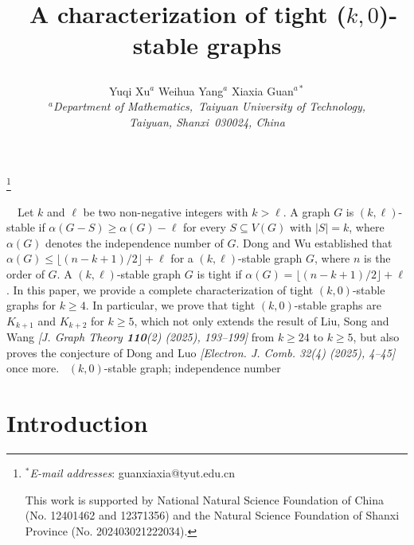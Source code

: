 \def\CTeXPreproc{Created by ctex v0.2.14, don't edit!}\def\CTeXPreproc{Created by ctex v0.2.14, don't edit!}\documentclass[11pt, twoside]{article}
\begin{document}
\setlength\abovedisplayskip{2pt}
\setlength\abovedisplayshortskip{0pt}
\setlength\belowdisplayskip{2pt}
\setlength\belowdisplayshortskip{0pt}

\title{\huge\  A characterization of tight ($ k, 0 $)-stable graphs
	\author{\small  Yuqi Xu$^{a}$ \quad Weihua Yang$^{a}$ \quad Xiaxia Guan$^{a*}$\\
		\small \textit{$^{a}$Department of Mathematics,\ Taiyuan University of Technology,}\\
		\small \textit{Taiyuan, Shanxi\ 030024, China}
	}\date{}}
\maketitle \footnote{
	\textit{$ ^* $E-mail addresses}: guanxiaxia@tyut.edu.cn
	
	This work is supported by National Natural Science Foundation of China (No. 12401462 and 12371356) and the Natural Science Foundation of Shanxi Province (No. 202403021222034). }



\begin{center}\begin{minipage}{14.5cm}


{\CJKfamily{}\small {}\ \ Let $ k $ and $ \ell $ be two non-negative integers with $ k>\ell $. A graph $G$ is $(k,\ell)$-stable if $\alpha(G-S) \geq \alpha(G)-\ell$ for every $S \subseteq V(G)$ with $|S|=k$, where $\alpha(G)$ denotes the independence number of $G$. Dong and Wu established that $\alpha(G) \leq \lfloor (n-k+1)/2 \rfloor + \ell$ for a $(k,\ell)$-stable graph $ G $, where $ n $ is the order of $ G $. A $(k,\ell)$-stable graph $ G $ is tight if $\alpha(G) = \lfloor (n-k+1)/2 \rfloor + \ell$. In this paper, we provide a complete characterization of tight $(k,0)$-stable graphs for $ k\geq 4 $. 
In particular, we prove that tight $(k,0)$-stable graphs are $ K_{k+1} $ and	$ K_{k+2} $ for $ k\geq 5 $, which not only extends the result of Liu, Song and Wang {\textit{[J. Graph Theory \textbf{110}(2) (2025), 193--199]}} from $ k\geq 24 $ to $ k\geq 5 $, but also proves the conjecture of Dong and Luo {\textit{[Electron. J. Comb. 32(4) (2025), 4--45]}} once more.
\vskip 2mm \ $ (k, 0) $-stable graph; independence number }
\end{minipage}\end{center}

\vskip 0.4cm

\section{Introduction}\label{section1}
\end{document}

